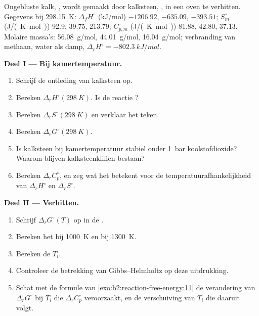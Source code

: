 \begin{problem}
\label{pb:b2:reaction-free-energy:1}
Ongebluste kalk, , wordt gemaakt door kalksteen, , in een oven te verhitten. Gegevens bij
\qty{298.15}{K}: $\Delta_f H^\circ$ (\unit{kJ/mol}) 
$-1206.92$,  $-635.09$,  $-393.51$; $S^\circ_m$
(\unit{J/(K.mol)}) 92.9, 39.75, 213.79; $C^\circ_{p,m}$ (\unit{J/(K.mol)})
81.88, 42.80, 37.13. Molaire massa's:  \qty{56.08}{g/mol}, 
\qty{44.01}{g/mol},  \qty{16.04}{g/mol}; verbranding van methaan,
water als damp, $\Delta_r H^\circ = \qty{-802.3}{kJ/mol}$.

\medskip
\noindent\textbf{Deel I --- Bij kamertemperatuur.}
\begin{enumerate}
  \item Schrijf de ontleding van kalksteen op.
  \item Bereken $\Delta_r H^\circ(\qty{298}{K})$. Is de reactie ?
  \item Bereken $\Delta_r S^\circ(\qty{298}{K})$ en verklaar het teken.
  \item Bereken $\Delta_r G^\circ(\qty{298}{K})$.
  \item Is kalksteen bij kamertemperatuur stabiel onder \qty{1}{bar}
        koolstofdioxide? Waarom blijven kalksteenkliffen bestaan?
  \item Bereken $\Delta_r C^\circ_p$, en zeg wat het betekent voor de
        temperatuurafhankelijkheid van $\Delta_r H^\circ$ en $\Delta_r S^\circ$.
\end{enumerate}

\medskip
\noindent\textbf{Deel II --- Verhitten.}
\begin{enumerate}[resume]
  \item Schrijf $\Delta_r G^\circ(T)$ op in de .
  \item Bereken het bij \qty{1000}{K} en bij \qty{1300}{K}.
  \item Bereken de  $T_i$.
  \item Controleer de betrekking van Gibbs--Helmholtz op deze uitdrukking.
  \item Schat met de formule van \cref{exo:b2:reaction-free-energy:11}
        de verandering van $\Delta_r G^\circ$ bij $T_i$ die
        $\Delta_r C^\circ_p$ veroorzaakt, en de verschuiving van $T_i$ die daaruit volgt.
\end{enumerate}


\end{problem}
